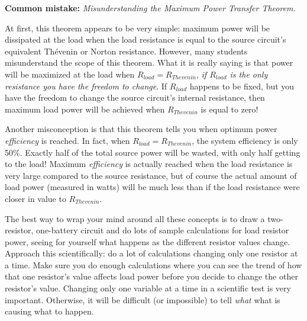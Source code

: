 \vskip 10pt

\noindent
{\bf Common mistake: } {\it Misunderstanding the Maximum Power Transfer Theorem.}

At first, this theorem appears to be very simple: maximum power will be dissipated at the load when the load resistance is equal to the source circuit's equivalent Th\'evenin or Norton resistance.  However, many students misunderstand the scope of this theorem.  What it is really saying is that power will be maximized at the load when $R_{load} = R_{Thevenin}$, {\it if $R_{load}$ is the only resistance you have the freedom to change}.  If $R_{load}$ happens to be fixed, but you have the freedom to change the source circuit's internal resistance, then maximum load power will be achieved when $R_{Thevenin}$ is equal to zero!

Another misconception is that this theorem tells you when optimum power {\it efficiency} is reached.  In fact, when $R_{load} = R_{Thevenin}$, the system efficiency is only 50\%.  Exactly half of the total source power will be wasted, with only half getting to the load!  Maximum {\it efficiency} is actually reached when the load resistance is very large compared to the source resistance, but of course the actual amount of load power (measured in watts) will be much less than if the load resistance were closer in value to $R_{Thevenin}$.

The best way to wrap your mind around all these concepts is to draw a two-resistor, one-battery circuit and do lots of sample calculations for load resistor power, seeing for yourself what happens as the different resistor values change.  Approach this scientifically: do a lot of calculations changing only one resistor at a time.  Make sure you do enough calculations where you can see the trend of how that one resistor's value affects load power before you decide to change the other resistor's value.  Changing only one variable at a time in a scientific test is very important.  Otherwise, it will be difficult (or impossible) to tell {\it what} what is causing what to happen.

